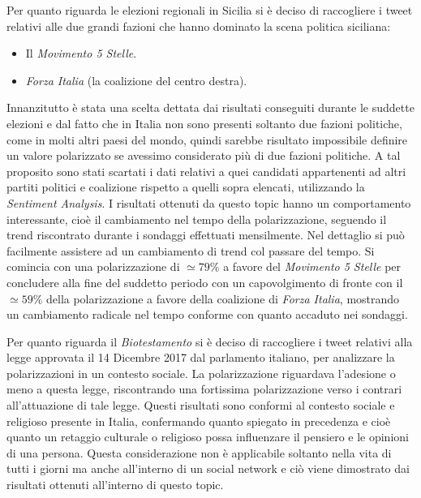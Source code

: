 Per quanto riguarda le elezioni regionali in Sicilia si è deciso di raccogliere i tweet relativi alle due grandi fazioni che hanno dominato la scena politica siciliana:
\begin{itemize}
\item  Il \textit{Movimento 5 Stelle}. 
\item \textit{Forza Italia} (la coalizione del centro destra).
\end{itemize}
Innanzitutto è stata una scelta dettata dai risultati conseguiti durante le suddette elezioni e dal fatto che in Italia non sono presenti soltanto due fazioni politiche, come in molti altri paesi del mondo, quindi sarebbe risultato impossibile definire un valore polarizzato se avessimo considerato più di due fazioni politiche.
A tal proposito sono stati scartati i dati relativi a quei candidati appartenenti ad altri partiti politici e coalizione rispetto a quelli sopra elencati, utilizzando la \textit{Sentiment Analysis}.
I risultati ottenuti da questo topic hanno un comportamento interessante, cioè il cambiamento nel tempo della polarizzazione, seguendo il trend riscontrato durante i sondaggi effettuati mensilmente. Nel dettaglio si può facilmente assistere ad un cambiamento di trend col passare del tempo.
Si comincia con una polarizzazione di $\simeq 79\%$  a favore del \textit{Movimento 5 Stelle} per concludere alla fine del suddetto periodo con un capovolgimento di fronte con il $\simeq 59\%$ della polarizzazione a favore della coalizione di \textit{Forza Italia}, mostrando un cambiamento radicale nel tempo conforme con quanto accaduto nei sondaggi.

Per quanto riguarda il \textit{Biotestamento} si è deciso di raccogliere i tweet relativi alla legge approvata il 14 Dicembre 2017 dal parlamento italiano, per analizzare la polarizzazioni in un contesto sociale.
La polarizzazione riguardava l'adesione o meno a questa legge, riscontrando una fortissima polarizzazione verso i contrari all'attuazione di tale legge. %
Questi risultati sono conformi al contesto sociale e religioso presente in Italia, confermando quanto spiegato in precedenza e cioè quanto un retaggio culturale o religioso possa influenzare il pensiero e le opinioni di una persona. Questa considerazione non è applicabile soltanto nella vita di tutti i giorni ma anche all'interno di un social network e ciò viene dimostrato dai risultati ottenuti all'interno di questo topic.

